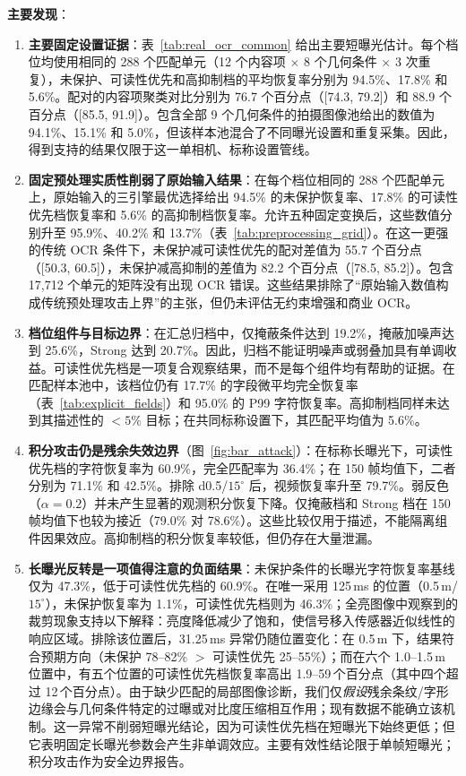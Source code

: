 \textbf{主要发现}：

\begin{enumerate}
\item \textbf{主要固定设置证据}：表~\ref{tab:real_ocr_common} 给出主要短曝光估计。每个档位均使用相同的 288 个匹配单元（12 个内容项 $\times$ 8 个几何条件 $\times$ 3 次重复），未保护、可读性优先和高抑制档的平均恢复率分别为 94.5\%、17.8\% 和 5.6\%。配对的内容项聚类对比分别为 76.7 个百分点（[74.3, 79.2]）和 88.9 个百分点（[85.5, 91.9]）。包含全部 9 个几何条件的拍摄图像池给出的数值为 94.1\%、15.1\% 和 5.0\%，但该样本池混合了不同曝光设置和重复采集。因此，得到支持的结果仅限于这一单相机、标称设置管线。

\item \textbf{固定预处理实质性削弱了原始输入结果}：在每个档位相同的 288 个匹配单元上，原始输入的三引擎最优选择给出 94.5\% 的未保护恢复率、17.8\% 的可读性优先档恢复率和 5.6\% 的高抑制档恢复率。允许五种固定变换后，这些数值分别升至 95.9\%、40.2\% 和 13.7\%（表~\ref{tab:preprocessing_grid}）。在这一更强的传统 OCR 条件下，未保护减可读性优先的配对差值为 55.7 个百分点（[50.3, 60.5]），未保护减高抑制的差值为 82.2 个百分点（[78.5, 85.2]）。包含 17,712 个单元的矩阵没有出现 OCR 错误。这些结果排除了“原始输入数值构成传统预处理攻击上界”的主张，但仍未评估无约束增强和商业 OCR。

\item \textbf{档位组件与目标边界}：在汇总归档中，仅掩蔽条件达到 19.2\%，掩蔽加噪声达到 25.6\%，Strong 达到 20.7\%。因此，归档不能证明噪声或弱叠加具有单调收益。可读性优先档是一项复合观察结果，而不是每个组件均有帮助的证据。在匹配样本池中，该档位仍有 17.7\% 的字段微平均完全恢复率（表~\ref{tab:explicit_fields}）和 95.0\% 的 P99 字符恢复率。高抑制档同样未达到其描述性的 $<5\%$ 目标；在共同标称设置下，其匹配平均值为 5.6\%。

\item \textbf{积分攻击仍是残余失效边界}（图~\ref{fig:bar_attack}）：在标称长曝光下，可读性优先档的字符恢复率为 60.9\%，完全匹配率为 36.4\%；在 150 帧均值下，二者分别为 71.1\% 和 42.5\%。排除 d0.5/$15^{\circ}$ 后，视频恢复率升至 79.7\%。弱反色（$\alpha=0.2$）并未产生显著的观测积分恢复下降。仅掩蔽档和 Strong 档在 150 帧均值下也较为接近（79.0\% 对 78.6\%）。这些比较仅用于描述，不能隔离组件因果效应。高抑制档的积分恢复率较低，但仍存在大量泄漏。

\item \textbf{长曝光反转是一项值得注意的负面结果}：未保护条件的长曝光字符恢复率基线仅为 47.3\%，低于可读性优先档的 60.9\%。在唯一采用 125\,ms 的位置（0.5\,m/$15^{\circ}$），未保护恢复率为 1.1\%，可读性优先档则为 46.3\%；全亮图像中观察到的裁剪现象支持以下解释：亮度降低减少了饱和，使信号移入传感器近似线性的响应区域。排除该位置后，31.25\,ms 异常仍随位置变化：在 0.5\,m 下，结果符合预期方向（未保护 78--82\% $>$ 可读性优先 25--55\%）；而在六个 1.0--1.5\,m 位置中，有五个位置的可读性优先档恢复率高出 1.9--59\,个百分点（其中四个超过 12\,个百分点）。由于缺少匹配的局部图像诊断，我们仅\emph{假设}残余条纹/字形边缘会与几何条件特定的过曝或对比度压缩相互作用；现有数据不能确立该机制。这一异常不削弱短曝光结论，因为可读性优先档在短曝光下始终更低；但它表明固定长曝光参数会产生非单调效应。主要有效性结论限于单帧短曝光；积分攻击作为安全边界报告。


\end{enumerate}
